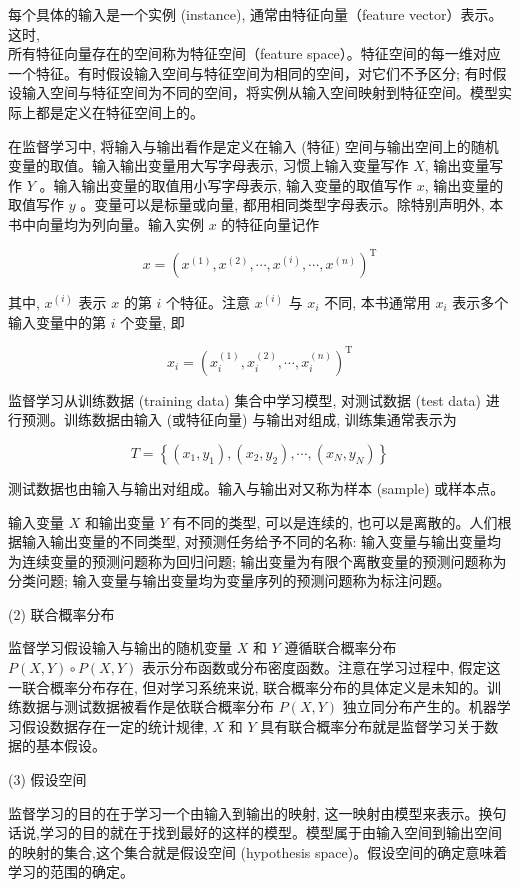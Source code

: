 \documentclass[10pt]{article}
\begin{document}
\begin{CJK*}{UTF8}{bsmi}
每个具体的输入是一个实例 (instance), 通常由特征向量（feature vector）表示。这时,\\
所有特征向量存在的空间称为特征空间（feature space）。特征空间的每一维对应一个特征。有时假设输入空间与特征空间为相同的空间，对它们不予区分; 有时假设输入空间与特征空间为不同的空间，将实例从输入空间映射到特征空间。模型实际上都是定义在特征空间上的。

在监督学习中, 将输入与输出看作是定义在输入 (特征) 空间与输出空间上的随机变量的取值。输入输出变量用大写字母表示, 习惯上输入变量写作 $X$, 输出变量写作 $Y$ 。输入输出变量的取值用小写字母表示, 输入变量的取值写作 $x$, 输出变量的取值写作 $y$ 。变量可以是标量或向量, 都用相同类型字母表示。除特别声明外, 本书中向量均为列向量。输入实例 $x$ 的特征向量记作

$$
x=\left(x^{(1)}, x^{(2)}, \cdots, x^{(i)}, \cdots, x^{(n)}\right)^{\mathrm{T}}
$$

其中, $x^{(i)}$ 表示 $x$ 的第 $i$ 个特征。注意 $x^{(i)}$ 与 $x_{i}$ 不同, 本书通常用 $x_{i}$ 表示多个输入变量中的第 $i$ 个变量, 即

$$
x_{i}=\left(x_{i}^{(1)}, x_{i}^{(2)}, \cdots, x_{i}^{(n)}\right)^{\mathrm{T}}
$$

监督学习从训练数据 (training data) 集合中学习模型, 对测试数据 (test data) 进行预测。训练数据由输入 (或特征向量) 与输出对组成, 训练集通常表示为

$$
T=\left\{\left(x_{1}, y_{1}\right),\left(x_{2}, y_{2}\right), \cdots,\left(x_{N}, y_{N}\right)\right\}
$$

测试数据也由输入与输出对组成。输入与输出对又称为样本 (sample) 或样本点。

输入变量 $X$ 和输出变量 $Y$ 有不同的类型, 可以是连续的, 也可以是离散的。人们根据输入输出变量的不同类型, 对预测任务给予不同的名称: 输入变量与输出变量均为连续变量的预测问题称为回归问题; 输出变量为有限个离散变量的预测问题称为分类问题; 输入变量与输出变量均为变量序列的预测问题称为标注问题。

(2) 联合概率分布

监督学习假设输入与输出的随机变量 $X$ 和 $Y$ 遵循联合概率分布 $P(X, Y) \circ P(X, Y)$ 表示分布函数或分布密度函数。注意在学习过程中, 假定这一联合概率分布存在, 但对学习系统来说, 联合概率分布的具体定义是未知的。训练数据与测试数据被看作是依联合概率分布 $P(X, Y)$ 独立同分布产生的。机器学习假设数据存在一定的统计规律, $X$ 和 $Y$ 具有联合概率分布就是监督学习关于数据的基本假设。

(3) 假设空间

监督学习的目的在于学习一个由输入到输出的映射, 这一映射由模型来表示。换句话说,学习的目的就在于找到最好的这样的模型。模型属于由输入空间到输出空间的映射的集合,这个集合就是假设空间 (hypothesis space)。假设空间的确定意味着学习的范围的确定。


\end{CJK*}
\end{document}
